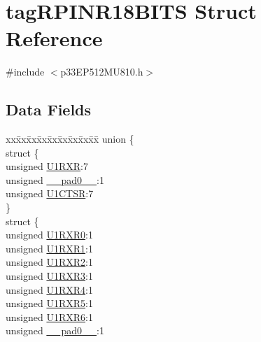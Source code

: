 \hypertarget{structtag_r_p_i_n_r18_b_i_t_s}{}\section{tag\+R\+P\+I\+N\+R18\+B\+I\+TS Struct Reference}
\label{structtag_r_p_i_n_r18_b_i_t_s}


{\ttfamily \#include $<$p33\+E\+P512\+M\+U810.\+h$>$}

\subsection*{Data Fields}
\begin{DoxyCompactItemize}
\item 
\begin{tabbing}
xx\=xx\=xx\=xx\=xx\=xx\=xx\=xx\=xx\=\kill
union \{\\
\>struct \{\\
\>\>unsigned \hyperlink{structtag_r_p_i_n_r18_b_i_t_s_a08d8ce898c9b691a85503cef4b34f779}{U1RXR}:7\\
\>\>unsigned \hyperlink{structtag_r_p_i_n_r18_b_i_t_s_adf71f3d8410c1f1dbbc96680a92c49af}{\_\_pad0\_\_}:1\\
\>\>unsigned \hyperlink{structtag_r_p_i_n_r18_b_i_t_s_a749674de10b21d91acfddeac33a1156d}{U1CTSR}:7\\
\>\} \\
\>struct \{\\
\>\>unsigned \hyperlink{structtag_r_p_i_n_r18_b_i_t_s_addcf4f9511c0974b702c610622f09e7b}{U1RXR0}:1\\
\>\>unsigned \hyperlink{structtag_r_p_i_n_r18_b_i_t_s_ad6557be57f40c0839924c0dd4553285a}{U1RXR1}:1\\
\>\>unsigned \hyperlink{structtag_r_p_i_n_r18_b_i_t_s_a29cde2a33da96c957472c9ce75a0a3ca}{U1RXR2}:1\\
\>\>unsigned \hyperlink{structtag_r_p_i_n_r18_b_i_t_s_afbf19713f9616d62f8c04e7f08b10f43}{U1RXR3}:1\\
\>\>unsigned \hyperlink{structtag_r_p_i_n_r18_b_i_t_s_a8d64142b395232a52d2c19763245bdbc}{U1RXR4}:1\\
\>\>unsigned \hyperlink{structtag_r_p_i_n_r18_b_i_t_s_a889b83444536e6cd71684ffbfcfbaba4}{U1RXR5}:1\\
\>\>unsigned \hyperlink{structtag_r_p_i_n_r18_b_i_t_s_ad58bf79b28f6a3fcb75948f1f07e08d5}{U1RXR6}:1\\
\>\>unsigned \hyperlink{structtag_r_p_i_n_r18_b_i_t_s_adf71f3d8410c1f1dbbc96680a92c49af}{\_\_pad0\_\_}:1\\

\end{tabbing}
\end{DoxyCompactItemize}
